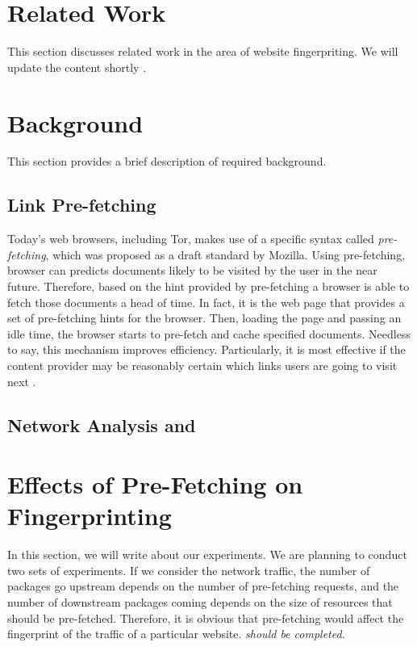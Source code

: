 \documentclass{sig-alternate-05-2015}
\begin{document}
\section{Related Work}
This section discusses related work in the area of website fingerpriting. We will update the content shortly \cite{Dyer:2012:PIS:2310656.2310689, panchenko11, wang2013improved, kopf2013preventing}.

\section{Background}
This section provides a brief description of required background.

\subsection{Link Pre-fetching}
 Today's web browsers, including Tor, makes use of a specific syntax called \emph{pre-fetching}, which was proposed as a draft standard by Mozilla. Using pre-fetching, browser can predicts documents likely to be visited by the user in the near future. Therefore, based on the hint provided by pre-fetching a browser is able to fetch those documents a head of time. In fact, it is the web page that provides a set of pre-fetching hints for the browser. Then, loading the page and passing an idle time, the browser starts to pre-fetch and cache specified documents. Needless to say, this mechanism improves efficiency. Particularly, it is most effective if the content provider may be reasonably certain which links users are going to visit next \cite{wikiPreF}.

 \subsection{Network Analysis and }

\section{Effects of Pre-Fetching on Fingerprinting}
In this section, we will write  about our experiments. We are planning to conduct two sets of experiments. If we consider the network traffic, the number of packages go upstream depends on the number of pre-fetching requests, and the number of downstream packages coming depends on the size of resources that should be pre-fetched. Therefore, it is obvious that pre-fetching would affect the fingerprint of the traffic of a particular website.  \emph{should be completed.}
\end{document}
